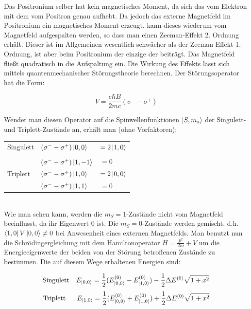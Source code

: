 Das Positronium selber hat kein magnetisches Moment, da sich das vom Elektron mit dem vom Positron genau aufhebt. Da jedoch das externe Magnetfeld im Positronium ein magnetisches Moment erzeugt, kann dieses wiederum vom Magnetfeld aufgespalten werden, so dass man einen Zeeman-Effekt 2. Ordnung erhält. Dieser ist im Allgemeinen wesentlich schwächer als der Zeeman-Effekt 1. Ordnung, ist aber beim Positronium der einzige der beiträgt. Das Magnetfeld fließt quadratisch in die Aufspaltung ein. Die Wirkung des Effekts lässt sich mittels quantenmechanischer Störungstheorie berechnen. Der Störungsoperator hat die Form:

\begin{equation} V=\frac{e\hbar B}{2mc}(\sigma^- - \sigma^+) \end{equation} 

Wendet man diesen Operator auf die Spinwellenfunktionen $\ket{S,m_s}$ der Singulett- und Triplett-Zustände an, erhält man (ohne Vorfaktoren):\\

\begin{tabular}[H]{l l l}
Singulett 	& $(\sigma^- - \sigma^+)\ket{0,0}$ &$ = 2\ket{1,0}$\\
& & \\
		& $(\sigma^- - \sigma^+)\ket{1,-1}$ & $ = 0$\\
Triplett 	& $(\sigma^- - \sigma^+)\ket{1,0}$ &$ = 2\ket{0,0}$\\
		& $(\sigma^- - \sigma^+)\ket{1,1}$ &$ = 0$\\
\end{tabular}\\

Wie man sehen kann, werden die $m_S = 1$-Zustände nicht vom Magnetfeld beeinflusst, da ihr Eigenwert 0 ist. Die $m_S = 0$-Zustände werden gemischt, d.h. $\bra{1,0}V\ket{0,0}\neq 0$ bei Anwesenheit eines externen Magnetfelds. Man benutzt nun die Schrödingergleichung mit dem Hamiltonoperator $H=\frac{p^2}{2m}+V$ um die Energieeigenwerte der beiden von der Störung betroffenen Zustände zu bestimmen. Die auf diesem Wege erhaltenen Energien sind:

\begin{equation} \text{Singulett\ \ \ } E_{\ket{0,0}} = \frac{1}{2}(E_{\ket{0,0}}^{(0)} - E_{\ket{1,0}}^{(0)}) - \frac{1}{2}\Delta E^{(0)}\sqrt{1+x^2} \end{equation}
\begin{equation} \text{Triplett\ \ \ \ \ } E_{\ket{1,0}} = \frac{1}{2}(E_{\ket{0,0}}^{(0)} + E_{\ket{1,0}}^{(0)}) + \frac{1}{2}\Delta E^{(0)}\sqrt{1+x^2} \end{equation}

